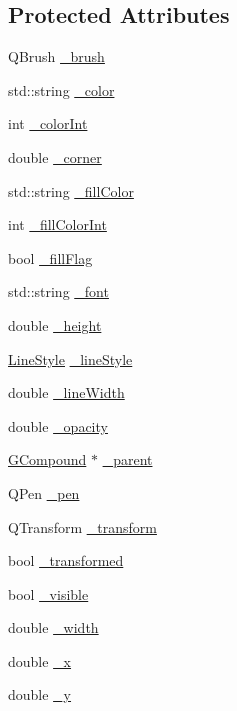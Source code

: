 \subsection*{Protected Attributes}
\begin{DoxyCompactItemize}
\item 
Q\+Brush \mbox{\hyperlink{classsgl_1_1GObject_aab24462ec896b596d99911767b0912d0}{\+\_\+brush}}
\item 
std\+::string \mbox{\hyperlink{classsgl_1_1GObject_a1134e770ae4315ea8bc1201e2f21da8b}{\+\_\+color}}
\item 
int \mbox{\hyperlink{classsgl_1_1GObject_a003fdd343d9b7505c53a8b7a134200ed}{\+\_\+color\+Int}}
\item 
double \mbox{\hyperlink{classsgl_1_1GRoundRect_aed2d721464238b51020f9ce90440ecde}{\+\_\+corner}}
\item 
std\+::string \mbox{\hyperlink{classsgl_1_1GObject_a179f8d6cee65cd8a54692e32b224392a}{\+\_\+fill\+Color}}
\item 
int \mbox{\hyperlink{classsgl_1_1GObject_a751def333a67d651e5b99cc331ecb496}{\+\_\+fill\+Color\+Int}}
\item 
bool \mbox{\hyperlink{classsgl_1_1GObject_ad4a55cbcd61b58a4d49666490bb2f103}{\+\_\+fill\+Flag}}
\item 
std\+::string \mbox{\hyperlink{classsgl_1_1GObject_aea76ea1a8b5dd7b0a78653277e63b536}{\+\_\+font}}
\item 
double \mbox{\hyperlink{classsgl_1_1GObject_ad05df29e7f27fc504abd743e3d8b4e73}{\+\_\+height}}
\item 
\mbox{\hyperlink{classsgl_1_1GObject_a86e0f5648542856159bb40775c854aa7}{Line\+Style}} \mbox{\hyperlink{classsgl_1_1GObject_a89bafecaafb7c72d55c7efc10b7d0523}{\+\_\+line\+Style}}
\item 
double \mbox{\hyperlink{classsgl_1_1GObject_a16e9033665937f13de2e163dc2184aff}{\+\_\+line\+Width}}
\item 
double \mbox{\hyperlink{classsgl_1_1GObject_a20eff8eb7af27182edc9bfc54768b6f3}{\+\_\+opacity}}
\item 
\mbox{\hyperlink{classsgl_1_1GCompound}{G\+Compound}} $\ast$ \mbox{\hyperlink{classsgl_1_1GObject_ac9452c1eaff70eebddbb318196aa3835}{\+\_\+parent}}
\item 
Q\+Pen \mbox{\hyperlink{classsgl_1_1GObject_afb69d172743f868299847174eb1b6bc8}{\+\_\+pen}}
\item 
Q\+Transform \mbox{\hyperlink{classsgl_1_1GObject_a475b8860a5f1adb4a1fdc58d1f5c1e32}{\+\_\+transform}}
\item 
bool \mbox{\hyperlink{classsgl_1_1GObject_ae4725802fc8d8aaa0ab4bd4781f7e07c}{\+\_\+transformed}}
\item 
bool \mbox{\hyperlink{classsgl_1_1GObject_a9312c72508471b7c7a87b540263e1af4}{\+\_\+visible}}
\item 
double \mbox{\hyperlink{classsgl_1_1GObject_ab55d85a3371770e6725b1062cf160cd8}{\+\_\+width}}
\item 
double \mbox{\hyperlink{classsgl_1_1GObject_a6675b83b27137b8d3aa2ad8133078ea6}{\+\_\+x}}
\item 
double \mbox{\hyperlink{classsgl_1_1GObject_a2f0f6aeafddc8a39c578bfa7e22b5f1e}{\+\_\+y}}
\end{DoxyCompactItemize}


